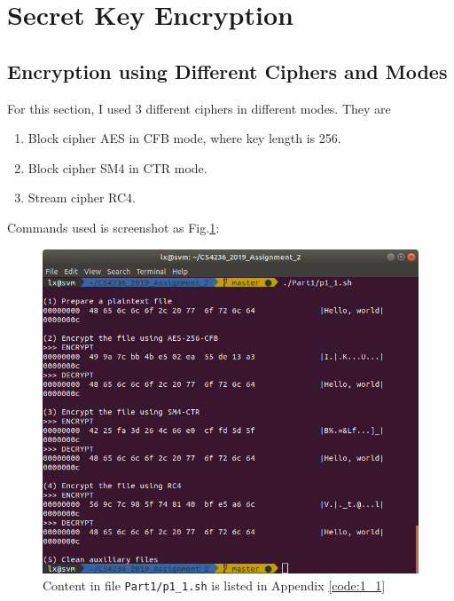 \section{Secret Key Encryption}

\subsection{Encryption using Different Ciphers and Modes}

For this section, I used 3 different ciphers in different modes. 
They are
\begin{enumerate}
    \item Block cipher AES in CFB mode, where key length is 256.
    \item Block cipher SM4 in CTR mode.
    \item Stream cipher RC4.
\end{enumerate}%

Commands used is screenshot as Fig.\ref{fig:p1_1}:

\begin{figure}[hb]
\centering
\includegraphics[width=\columnwidth]{resources/p1_1.png}
\caption{
    Content in file \texttt{Part1/p1\_1.sh} is listed in Appendix \ref{code:1_1}
}
\label{fig:p1_1}
\end{figure}

